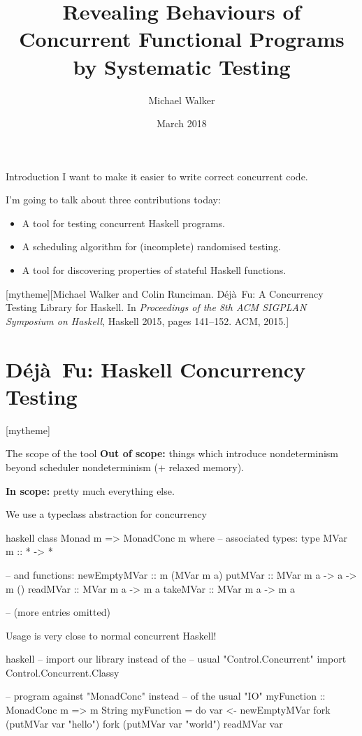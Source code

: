 \documentclass{beamer}
\title{Revealing Behaviours of Concurrent Functional Programs by Systematic Testing}
\date{March 2018}
\author{Michael Walker}
\newcommand{\sectiontext}[2]{
   \setbeamertemplate{section page}[mytheme][#2]
   \section{#1}
   \setbeamertemplate{section page}[mytheme]
}
\newcommand{\dejafu}{D\'{e}j\`{a}~Fu}
\begin{document}
\maketitle

\begin{frame}{Introduction}
  I want to make it easier to write correct concurrent code.

  I'm going to talk about three contributions today:

  \begin{itemize}
  \item A tool for testing concurrent Haskell programs.
  \item A scheduling algorithm for (incomplete) randomised testing.
  \item A tool for discovering properties of stateful Haskell
    functions.
  \end{itemize}
\end{frame}

\sectiontext{\dejafu{}: Haskell Concurrency Testing}{Michael Walker and Colin Runciman.  \dejafu{}: A Concurrency Testing Library for Haskell.  In \emph{Proceedings of the 8th ACM SIGPLAN Symposium on Haskell}, Haskell 2015, pages 141--152.  ACM, 2015.}

\begin{frame}{The scope of the tool}
  \textbf{Out of scope:} things which introduce nondeterminism beyond
  scheduler nondeterminism (+ relaxed memory).

  \textbf{In scope:} pretty much everything else.
\end{frame}

\begin{frame}[fragile]{We use a typeclass abstraction for concurrency}
\begin{center}
\begin{cminted}{haskell}
class Monad m => MonadConc m where
  -- associated types:
  type MVar m :: * -> *

  -- and functions:
  newEmptyMVar :: m (MVar m a)
  putMVar  :: MVar m a -> a -> m ()
  readMVar :: MVar m a -> m a
  takeMVar :: MVar m a -> m a

  -- (more entries omitted)
\end{cminted}
\end{center}
\end{frame}

\begin{frame}[fragile]{Usage is very close to normal concurrent Haskell!}
\begin{center}
\begin{cminted}{haskell}
-- import our library instead of the
-- usual "Control.Concurrent"
import Control.Concurrent.Classy

-- program against "MonadConc" instead
-- of the usual "IO"
myFunction :: MonadConc m => m String
myFunction = do
  var <- newEmptyMVar
  fork (putMVar var "hello")
  fork (putMVar var "world")
  readMVar var
\end{cminted}
\end{center}
\end{frame}
\end{document}
